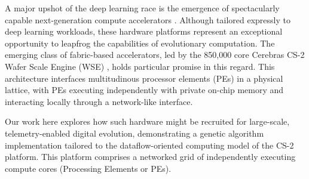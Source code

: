 A major upshot of the deep learning race is the emergence of spectacularly capable next-generation compute accelerators \citep{zhang2016cambricon,emani2021accelerating,jia2019dissecting,medina2020habana}.
Although tailored expressly to deep learning workloads, these hardware platforms represent an exceptional opportunity to leapfrog the capabilities of evolutionary computation.
The emerging class of fabric-based accelerators, led by the 850,000 core Cerebras CS-2 Wafer Scale Engine (WSE) \citep{lauterbach2021path,lie2022cerebras}, holds particular promise in this regard.
This architecture interfaces multitudinous processor elements (PEs) in a physical lattice, with PEs executing independently with private on-chip memory and interacting locally through a network-like interface.

Our work here explores how such hardware might be recruited for large-scale, telemetry-enabled digital evolution, demonstrating a genetic algorithm implementation tailored to the dataflow-oriented computing model of the CS-2 platform.
This platform comprises a networked grid of independently executing compute cores (Processing Elements or PEs).





